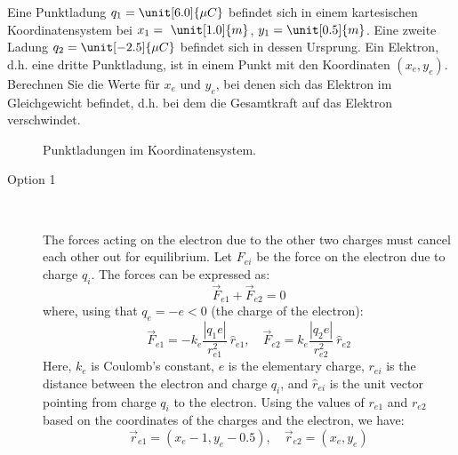 \begin{ejercicio}
    Eine Punktladung $q_1=\unit[6.0]{\mu C}$ befindet sich in einem kartesischen Koordinatensystem bei $x_1=~\unit[1.0]{m}$, $y_1=\unit[0.5]{m}$. Eine zweite Ladung $q_2=\unit[-2.5]{\mu C}$ befindet sich in dessen Ursprung. Ein Elektron, d.h. eine dritte Punktladung, ist in einem Punkt mit den Koordinaten $(x_e,y_e)$. Berechnen Sie die Werte für $x_e$ und $y_e$, bei denen sich das Elektron im Gleichgewicht befindet, d.h. bei dem die Gesamtkraft auf das Elektron verschwindet.
    \begin{figure}
        \centering
        \caption{Punktladungen im Koordinatensystem.}
        \label{fig:point_charges}
    \end{figure}

    \begin{description}
        \item[Option 1]~
        
        The forces acting on the electron due to the other two charges must cancel each other out for equilibrium. Let $F_{ei}$ be the force on the electron due to charge $q_i$. The forces can be expressed as:
        \begin{equation*}
            \vec{F}_{e1} + \vec{F}_{e2} = 0
        \end{equation*}
        where, using that $q_e=-e<0$ (the charge of the electron):
        \begin{equation*}
            \vec{F}_{e1} = -k_e \frac{|q_1 e|}{r_{e1}^2} \ \hat{r}_{e1}, \quad \vec{F}_{e2} = k_e \frac{|q_2 e|}{r_{e2}^2} \ \hat{r}_{e2}
        \end{equation*}
        Here, $k_e$ is Coulomb's constant, $e$ is the elementary charge, $r_{ei}$ is the distance between the electron and charge $q_i$, and $\hat{r}_{ei}$ is the unit vector pointing from charge $q_i$ to the electron. Using the values of $r_{e1}$ and $r_{e2}$ based on the coordinates of the charges and the electron, we have:
        \begin{equation*}
            \vec{r}_{e1} = (x_e - 1, y_e - 0.5), \quad \vec{r}_{e2} = (x_e, y_e)
        \end{equation*}


\end{description}
\end{ejercicio}
